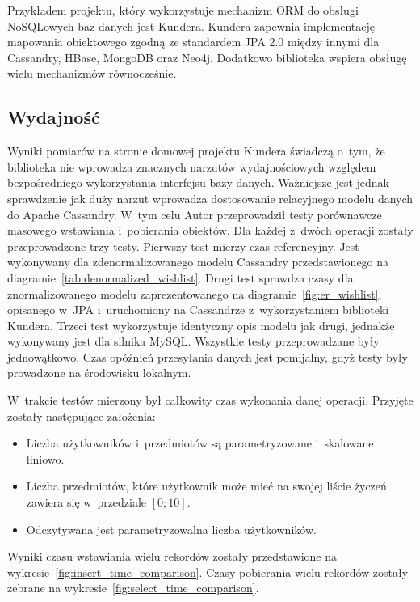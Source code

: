 Przykładem projektu, który wykorzystuje mechanizm ORM do obsługi NoSQLowych baz danych jest Kundera.\cite{kundera_home} Kundera zapewnia implementację mapowania obiektowego zgodną ze standardem JPA 2.0 między innymi dla Cassandry, HBase, MongoDB oraz Neo4j. Dodatkowo biblioteka wspiera obsługę wielu mechanizmów równocześnie.

\subsection{Wydajność}

Wyniki pomiarów na stronie domowej projektu Kundera świadczą o~tym, że biblioteka nie wprowadza znacznych narzutów wydajnościowych względem bezpośredniego wykorzystania interfejsu bazy danych. Ważniejsze jest jednak sprawdzenie jak duży narzut wprowadza dostosowanie relacyjnego modelu danych do Apache Cassandry. W~tym celu Autor przeprowadził testy porównawcze masowego wstawiania i~pobierania obiektów. Dla każdej z~dwóch operacji zostały przeprowadzone trzy testy. Pierwszy test mierzy czas referencyjny. Jest wykonywany dla zdenormalizowanego modelu Cassandry przedstawionego na diagramie~\ref{tab:denormalized_wishlist}. Drugi test sprawdza czasy dla znormalizowanego modelu zaprezentowanego na diagramie~\ref{fig:er_wishlist}, opisanego w~JPA i~uruchomiony na Cassandrze z~wykorzystaniem biblioteki Kundera. Trzeci test wykorzystuje identyczny opis modelu jak drugi, jednakże wykonywany jest dla silnika MySQL. Wszystkie testy przeprowadzane były jednowątkowo. Czas opóźnień przesyłania danych jest pomijalny, gdyż testy były prowadzone na środowisku lokalnym.

W~trakcie testów mierzony był całkowity czas wykonania danej operacji. Przyjęte zostały następujące założenia:

\begin{itemize}
	\item Liczba użytkowników i~przedmiotów są parametryzowane i~skalowane liniowo.
	\item Liczba przedmiotów, które użytkownik może mieć na swojej liście życzeń zawiera się w~przedziale $[0;10]$.
	\item Odczytywana jest parametryzowalna liczba użytkowników.
\end{itemize}

\noindent Wyniki czasu wstawiania wielu rekordów zostały przedstawione na wykresie~\ref{fig:insert_time_comparison}. Czasy pobierania wielu rekordów zostały zebrane na wykresie~\ref{fig:select_time_comparison}.


